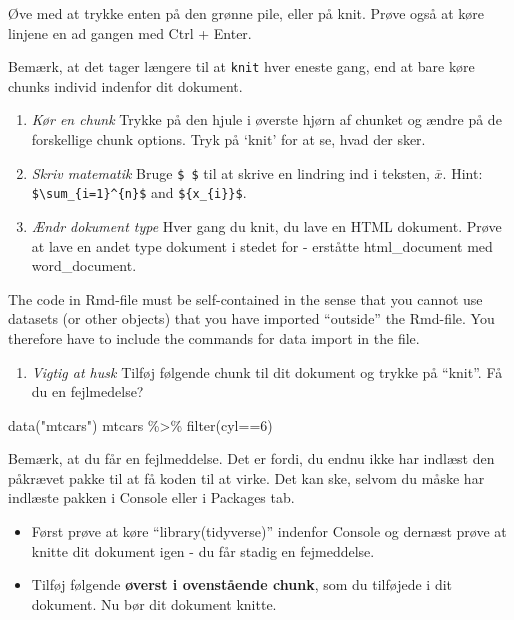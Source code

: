 \documentclass[
]{book}
\newenvironment{Shaded}{\begin{snugshade}}{\end{snugshade}}
\newcommand{\DecValTok}[1]{\textcolor[rgb]{0.00,0.00,0.81}{#1}}
\newcommand{\FunctionTok}[1]{\textcolor[rgb]{0.00,0.00,0.00}{#1}}
\newcommand{\NormalTok}[1]{#1}
\newcommand{\SpecialCharTok}[1]{\textcolor[rgb]{0.00,0.00,0.00}{#1}}
\newcommand{\StringTok}[1]{\textcolor[rgb]{0.31,0.60,0.02}{#1}}
\providecommand{\tightlist}{%
  \setlength{\itemsep}{0pt}\setlength{\parskip}{0pt}}
\begin{document}
Øve med at trykke enten på den grønne pile, eller på knit. Prøve også at køre linjene en ad gangen med Ctrl + Enter.

Bemærk, at det tager længere til at \texttt{knit} hver eneste gang, end at bare køre chunks individ indenfor dit dokument.

\begin{enumerate}
\def\labelenumi{\arabic{enumi})}
\setcounter{enumi}{5}
\item
  \emph{Kør en chunk} Trykke på den hjule i øverste hjørn af chunket og ændre på de forskellige chunk options. Tryk på `knit' for at se, hvad der sker.
\item
  \emph{Skriv matematik} Bruge \texttt{\$\ \$} til at skrive en lindring ind i teksten, \(\bar{x}\). Hint: \texttt{\$\textbackslash{}sum\_\{i=1\}\^{}\{n\}\$} and \texttt{\$\{x\_\{i\}\}\$}.
\item
  \emph{Ændr dokument type} Hver gang du knit, du lave en HTML dokument. Prøve at lave en andet type dokument i stedet for - erståtte html\_document med word\_document.
\end{enumerate}

The code in Rmd-file must be self-contained in the sense that you cannot use datasets (or other objects)
that you have imported ``outside'' the Rmd-file. You therefore have to include the commands for data
import in the file.

\begin{enumerate}
\def\labelenumi{\arabic{enumi})}
\setcounter{enumi}{8}
\tightlist
\item
  \emph{Vigtig at husk} Tilføj følgende chunk til dit dokument og trykke på ``knit''. Få du en fejlmedelse?
\end{enumerate}

\begin{Shaded}
\begin{Highlighting}[]
\FunctionTok{data}\NormalTok{(}\StringTok{"mtcars"}\NormalTok{)}
\NormalTok{mtcars }\SpecialCharTok{\%\textgreater{}\%} \FunctionTok{filter}\NormalTok{(cyl}\SpecialCharTok{==}\DecValTok{6}\NormalTok{)}
\end{Highlighting}
\end{Shaded}

Bemærk, at du får en fejlmeddelse. Det er fordi, du endnu ikke har indlæst den påkrævet pakke til at få koden til at virke. Det kan ske, selvom du måske har indlæste pakken i Console eller i Packages tab.

\begin{itemize}
\tightlist
\item
  Først prøve at køre ``library(tidyverse)'' indenfor Console og dernæst prøve at knitte dit dokument igen - du får stadig en fejmeddelse.
\item
  Tilføj følgende \textbf{øverst i ovenstående chunk}, som du tilføjede i dit dokument. Nu bør dit dokument knitte.
\end{itemize}
\end{document}
